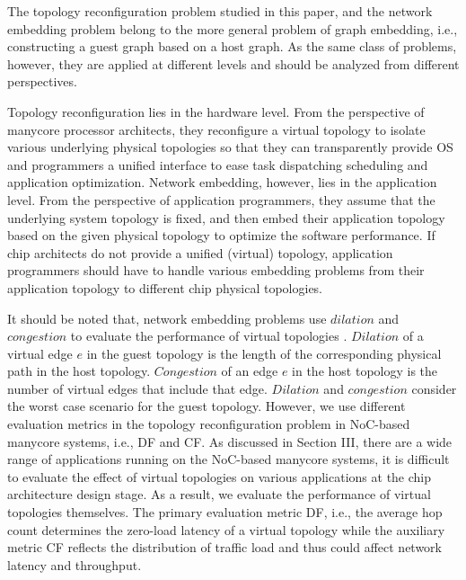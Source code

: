The topology reconfiguration problem studied in this paper, and the network embedding problem belong to the more general problem of graph embedding, i.e., constructing a guest graph based on a host graph. As the same class of problems, however, they are applied at different levels and should be analyzed from different perspectives.

Topology reconfiguration lies in the hardware level. From the perspective of manycore processor architects, they reconfigure a virtual topology to isolate various underlying physical topologies so that they can transparently provide OS and programmers a unified interface to ease task dispatching scheduling and application optimization. Network embedding, however, lies in the application level. From the perspective of application programmers, they assume that the underlying system topology is fixed, and then embed their application topology based on the given physical topology to optimize the software performance. If chip architects do not provide a unified (virtual) topology, application programmers should have to handle various embedding problems from their application topology to different chip physical topologies.

It should be noted that, network embedding problems use $dilation$ and $congestion$ to evaluate the performance of virtual topologies \cite{kim1999approach}. $Dilation$ of a virtual edge $e$ in the guest topology is the length of the corresponding physical path in the host topology. $Congestion$ of an edge $e$ in the host topology is the number of virtual edges that include that edge. $Dilation$ and $congestion$ consider the worst case scenario for the guest topology. However, we use different evaluation metrics in the topology reconfiguration problem in NoC-based manycore systems, i.e., DF and CF. As discussed in Section III, there are a wide range of applications running on the NoC-based manycore systems, it is difficult to evaluate the effect of virtual topologies on various applications at the chip architecture design stage. As a result, we evaluate the performance of virtual topologies themselves. The primary evaluation metric DF, i.e., the average hop count determines the zero-load latency of a virtual topology while the auxiliary metric CF reflects the distribution of traffic load and thus could affect network latency and throughput.

